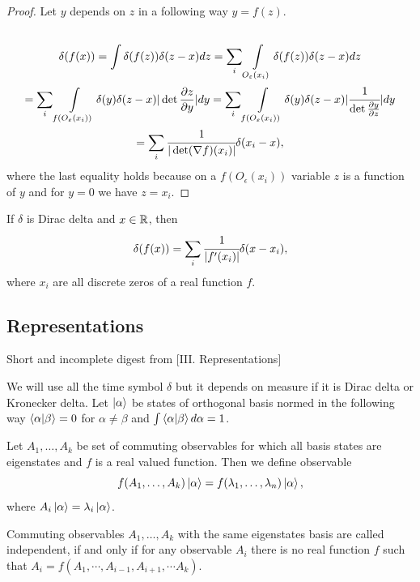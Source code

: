 \documentclass[main.tex]{subfiles}
\begin{document}
\begin{proof}
Let $y$ depends on $z$ in a following way $y = f(z)$.
\begin{multline*}
\\
\delta(f(x)) = \int \delta(f(z))\delta(z - x) dz = \sum_i \int\limits_{O_\epsilon(x_i)}
\delta(f(z))\delta(z - x) dz \\
= \sum_i \int\limits_{f(O_\epsilon(x_i))}
\delta(y)\delta(z - x) |\det \frac{\partial z}{\partial y}| dy = \sum_i \int\limits_{f(O_\epsilon(x_i))}
\delta(y)\delta(z - x) |\cfrac{1}{\det \frac{\partial y}{\partial z}}| dy
\\ =   \sum_i \cfrac{1}{|\det (\nabla f)(x_i)|}\delta(x_i-x),
\\
\end{multline*}
where the last equality holds because on a $f(O_\epsilon(x_i))$ variable $z$ is a function of $y$ and for $y=0$ we have $z = x_i$. 
\end{proof}

\begin{corollary}
If $\delta$ is Dirac delta and $x\in \R$, then
\begin{equation}
\delta(f(x)) = \sum_i \cfrac{1}{|f'(x_i)|}\delta(x-x_i),
\end{equation}
where $x_i$ are all discrete zeros of a real function $f$.
\end{corollary}
\subsection{Representations}

Short and incomplete digest from \cite{dirac1981}[III. Representations]

We will use all the time symbol $\delta$ but it depends on measure if it is Dirac delta or Kronecker delta.  
Let $\ket{\alpha}$ be states of orthogonal basis normed in the following way $\bra{\alpha}\ket{\beta} = 0$ for $\alpha \not=\beta$ and $\int \bra{\alpha}\ket{\beta} d\alpha = 1$.
\begin{definition}
Let $A_1, \dots, A_k$ be set of commuting observables for which all basis states are eigenstates and $f$ is a real valued function. Then we define observable
\begin{equation}
f(A_1, \dots, A_k)\ket{\alpha} = f(\lambda_1, \dots, \lambda_n)\ket{\alpha},
\end{equation}
where $A_i \ket{\alpha} = \lambda_i \ket{\alpha}$.  
\end{definition}

\begin{definition}
Commuting observables $A_1, \dots, A_k$ with the same eigenstates basis are called independent, if and only if for any observable 
$A_i$ there is no real function $f$ such that $A_i = f(A_1, \cdots, A_{i-1}, A_{i+1}, \cdots A_k)$.
\end{definition}
\end{document}
